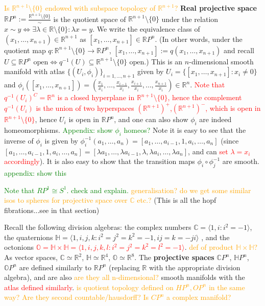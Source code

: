 \documentclass[a4paper]{article}
\theoremstyle{definition} \newtheorem*{definition}{Definition}
\theoremstyle{definition} \newtheorem*{definitions}{Definitions}
\theoremstyle{plain} \newtheorem{theorem}{Theorem}[section]
\theoremstyle{plain} \newtheorem{proposition}[theorem]{Proposition}
\theoremstyle{plain} \newtheorem{corollary}[theorem]{Corollary}
\theoremstyle{plain} \newtheorem{lemma}[theorem]{Lemma}
\theoremstyle{plain} \newtheorem{example}[theorem]{Example}
\newcommand{\checkCorrect}[1]{\textcolor{red}{#1}}
\newcommand{\question}[1]{\textcolor{orange}{#1}}
\newcommand{\finish}[1]{\textcolor{green}{#1}}
\newcommand{\defn}[1]{\textbf{#1}}
\newcommand{\realnos}{\mathbb{R}}
\newcommand{\complexnos}{\mathbb{C}}
\begin{document}
\question{Is $\realnos^{n+1}\setminus \{0\}$ endowed with subspace topology of $\realnos^{n+1}$?}
\defn{Real projective space} $\realnos P^n := \frac{\realnos^{n+1}\setminus \{0\}}{\sim}$ is the quotient space of $\realnos^{n+1}\setminus \{0\}$ under the relation $x\sim y \iff \exists \lambda \in \realnos \setminus \{0\} : \lambda x=y$. We write the equivalence class of $(x_1, \ldots, x_{n+1})\in \realnos^{n+1}$ as $[x_1, \ldots, x_{n+1}]\in \realnos P^n$. (In other words, under the quotient map $q:\realnos^{n+1}\setminus \{0\}\to \realnos P^n$, $[x_1, \ldots, x_{n+1}]:=q(x_1, \ldots, x_{n+1})$ and recall $U \subseteq \realnos P^n \textrm{ open} \iff q^{-1}(U) \subseteq \realnos^{n+1}\setminus \{0\} \textrm{ open}$.) This is an $n$-dimensional smooth manifold with atlas $\{(U_i, \phi_i)\}_{i=1, \ldots, n+1}$ given by $U_i=\{[x_1, \ldots, x_{n+1}]: x_i\neq 0\}$ and $\phi_i([x_1, \ldots, x_{n+1}])=(\frac{x_1}{x_i}, \ldots , \frac{x_{i-1}}{x_i}, \frac{x_{i+1}}{x_i}, \ldots, \frac{x_{n+1}}{x_i})\in \realnos^n$. \checkCorrect{Note that $q^{-1}(U_i)^C=\realnos^n$ is a closed hyperplane in $\realnos^{n+1}\setminus \{0\}$, hence the complement $q^{-1}(U_i)$ is the union of two hyperspaces $(\realnos^{n+1})^+$,$(\realnos^{n+1})^-$, which is open in $\realnos^{n+1}\setminus \{0\}$}, hence $U_i$ is open in $\realnos P^n$, and one can also show $\phi_i$ are indeed homeomorphisms. \finish{Appendix: show $\phi_i$ homeos?} Note it is easy to see that the inverse of $\phi_i$ is given by $\phi_i^{-1}(a_1, \ldots, a_n)=[a_1, \ldots, a_{i-1}, 1, a_{i}, \ldots, a_n]$ (since $[a_1, \ldots, a_{i-1}, 1, a_{i}, \ldots, a_n]=[\lambda a_1, \ldots, \lambda a_{i-1}, \lambda, \lambda a_{i}, \ldots, \lambda a_n]$, and can \checkCorrect{set $\lambda=x_i$ accordingly}). It is also easy to show that the transition maps $\phi_i\circ \phi_j^{-1}$ are smooth. \finish{appendix: show this}

\finish{Note that $RP^1 \cong S^1$. check and explain.} \question{generalisation? do we get some similar isos to spheres for projective space over $\complexnos$ etc.?} (This is all the hopf fibrations...see in that section)

 Recall the following division algebras: the complex numbers $\complexnos = \langle 1, i: i^2=-1 \rangle$, the quaternions $\mathbb{H} = \langle 1, i, j, k: i^2=j^2=k^2=-1, ij=k=-ji \rangle$ , and the octonions \checkCorrect{$\mathbb{O} = \mathbb{H}\times \mathbb{H}=\langle 1, i, j, k, l: i^2=j^2=k^2=l^2=-1 \rangle$}. \question{def of product $\mathbb{H}\times \mathbb{H}$?} As vector spaces, $\complexnos \simeq \realnos^2$, $\mathbb{H} \simeq \realnos^4$, $\mathbb{O} \simeq \realnos^8$. The \defn{projective spaces} $\complexnos P^n$, $\mathbb{H} P^n$, $\mathbb{O} P^n$ are defined similarly to $\realnos P^n$ (replacing $\realnos$ with the appropriate division algebra), and are also \question{are they all n-dimensional?} smooth manifolds with the \checkCorrect{atlas defined similarly}.
\question{is quotient topology defined on $HP^n, OP^n$ in the same way? Are they second countable/hausdorff?}
\question{Is $CP^n$ a complex manifold?}
\end{document}
